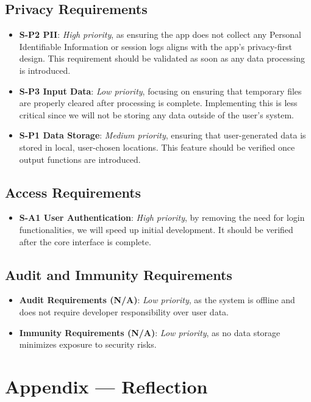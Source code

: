 \documentclass{article}
\begin{document}
\subsection{Privacy Requirements}
\begin{itemize}
    \item \textbf{S-P2 PII}: \textit{High priority}, as ensuring the app does not collect any Personal Identifiable Information or session logs aligns with the app’s privacy-first design. This requirement should be validated as soon as any data processing is introduced.
    \item \textbf{S-P3 Input Data}: \textit{Low priority}, focusing on ensuring that temporary files are properly cleared after processing is complete. Implementing this is less critical since we will not be storing any data outside of the user’s system.
    \item \textbf{S-P1 Data Storage}: \textit{Medium priority}, ensuring that user-generated data is stored in local, user-chosen locations. This feature should be verified once output functions are introduced.
\end{itemize}

\subsection{Access Requirements}
\begin{itemize}
    \item \textbf{S-A1 User Authentication}: \textit{High priority}, by removing the need for login functionalities, we will speed up initial development. It should be verified after the core interface is complete.
\end{itemize}

\subsection{Audit and Immunity Requirements}
\begin{itemize}
    \item \textbf{Audit Requirements (N/A)}: \textit{Low priority}, as the system is offline and does not require developer responsibility over user data.
    \item \textbf{Immunity Requirements (N/A)}: \textit{Low priority}, as no data storage minimizes exposure to security risks.
\end{itemize}


\newpage{}

\section*{Appendix --- Reflection}
\end{document}
